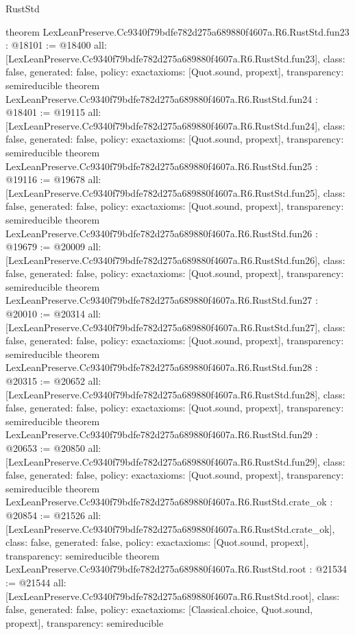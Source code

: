 \begin{lexlean}{RustStd}
\begin{coremodule}
{}
theorem LexLeanPreserve.Cc9340f79bdfe782d275a689880f4607a.R6.RustStd.fun23 : @18101 := @18400 {
  all: [LexLeanPreserve.Cc9340f79bdfe782d275a689880f4607a.R6.RustStd.fun23],
  class: false,
  generated: false,
  policy: exact{axioms: [Quot.sound, propext]},
  transparency: semireducible
}
theorem LexLeanPreserve.Cc9340f79bdfe782d275a689880f4607a.R6.RustStd.fun24 : @18401 := @19115 {
  all: [LexLeanPreserve.Cc9340f79bdfe782d275a689880f4607a.R6.RustStd.fun24],
  class: false,
  generated: false,
  policy: exact{axioms: [Quot.sound, propext]},
  transparency: semireducible
}
theorem LexLeanPreserve.Cc9340f79bdfe782d275a689880f4607a.R6.RustStd.fun25 : @19116 := @19678 {
  all: [LexLeanPreserve.Cc9340f79bdfe782d275a689880f4607a.R6.RustStd.fun25],
  class: false,
  generated: false,
  policy: exact{axioms: [Quot.sound, propext]},
  transparency: semireducible
}
theorem LexLeanPreserve.Cc9340f79bdfe782d275a689880f4607a.R6.RustStd.fun26 : @19679 := @20009 {
  all: [LexLeanPreserve.Cc9340f79bdfe782d275a689880f4607a.R6.RustStd.fun26],
  class: false,
  generated: false,
  policy: exact{axioms: [Quot.sound, propext]},
  transparency: semireducible
}
theorem LexLeanPreserve.Cc9340f79bdfe782d275a689880f4607a.R6.RustStd.fun27 : @20010 := @20314 {
  all: [LexLeanPreserve.Cc9340f79bdfe782d275a689880f4607a.R6.RustStd.fun27],
  class: false,
  generated: false,
  policy: exact{axioms: [Quot.sound, propext]},
  transparency: semireducible
}
theorem LexLeanPreserve.Cc9340f79bdfe782d275a689880f4607a.R6.RustStd.fun28 : @20315 := @20652 {
  all: [LexLeanPreserve.Cc9340f79bdfe782d275a689880f4607a.R6.RustStd.fun28],
  class: false,
  generated: false,
  policy: exact{axioms: [Quot.sound, propext]},
  transparency: semireducible
}
theorem LexLeanPreserve.Cc9340f79bdfe782d275a689880f4607a.R6.RustStd.fun29 : @20653 := @20850 {
  all: [LexLeanPreserve.Cc9340f79bdfe782d275a689880f4607a.R6.RustStd.fun29],
  class: false,
  generated: false,
  policy: exact{axioms: [Quot.sound, propext]},
  transparency: semireducible
}
theorem LexLeanPreserve.Cc9340f79bdfe782d275a689880f4607a.R6.RustStd.crate_ok : @20854 := @21526 {
  all: [LexLeanPreserve.Cc9340f79bdfe782d275a689880f4607a.R6.RustStd.crate_ok],
  class: false,
  generated: false,
  policy: exact{axioms: [Quot.sound, propext]},
  transparency: semireducible
}
theorem LexLeanPreserve.Cc9340f79bdfe782d275a689880f4607a.R6.RustStd.root : @21534 := @21544 {
  all: [LexLeanPreserve.Cc9340f79bdfe782d275a689880f4607a.R6.RustStd.root],
  class: false,
  generated: false,
  policy: exact{axioms: [Classical.choice, Quot.sound, propext]},
  transparency: semireducible
}


\end{coremodule}
\end{lexlean}
